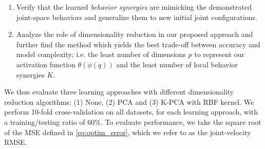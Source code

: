 \documentclass[letterpaper, 10 pt, journal, twoside, fleqn]{IEEEtran}
\begin{document}
\begin{enumerate}[leftmargin=*]
\item Verify that the learned \textit{behavior synergies} are mimicking the demonstrated joint-space behaviors and generalize them to new initial joint configurations.
\item Analyze the role of dimensionality reduction in our proposed approach and further find the method which yields the best trade-off between accuracy and model complexity; i.e. the least number of dimensions $p$ to represent our activation function $\theta(\phi(q))$ and the least number of local behavior synergies $K$.
\end{enumerate}
We thus evaluate three learning approaches with different dimensionality reduction algorithms: (1) None, (2) PCA and (3) K-PCA with RBF kernel.
We perform 10-fold cross-validation on all datasets, for each learning approach, with a training/testing ratio of $60 \%$. To evaluate performance, we take the square root of the MSE defined in \eqref{eq:optim_error}, which we refer to as the joint-velocity RMSE. 
\end{document}
